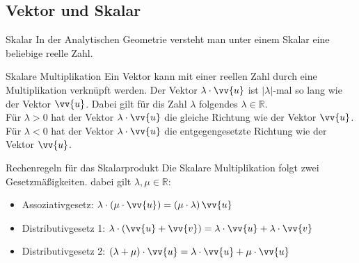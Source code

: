 \subsection{Vektor und Skalar}
\begin{merke}{Skalar}{}
   In der Analytischen Geometrie versteht man unter einem Skalar eine beliebige reelle Zahl. 
\end{merke}
\begin{defi}{Skalare Multiplikation}{}
Ein Vektor kann mit einer reellen Zahl durch eine Multiplikation verknüpft werden. Der Vektor $\lambda \cdot \vv{u}$ ist $|\lambda|$-mal so lang wie der Vektor $\vv{u}$. Dabei gilt für dis Zahl $\lambda$ folgendes $\lambda \in \mathds{R}$.\\
Für $\lambda > 0$ hat der Vektor $\lambda \cdot \vv{u}$ die gleiche Richtung wie der Vektor $\vv{u}$.\\
Für $\lambda < 0$ hat der Vektor $\lambda \cdot \vv{u}$ die entgegengesetzte Richtung wie der Vektor  $\vv{u}$.\\
\begin{center}
\end{center}
\end{defi}
\begin{satz}{Rechenregeln für das Skalarprodukt}{}
Die Skalare Multiplikation folgt zwei Gesetzmäßigkeiten. dabei gilt $\lambda, \mu \in \mathds{R}$:
\begin{itemize}
    \item Assoziativgesetz: $\lambda \cdot \left(\mu \cdot \vv{u}\right) =\left( \mu \cdot \lambda \right)\vv{u}$
    \item Distributivgesetz 1: $\lambda \cdot \left(\vv{u} + \vv{v}\right) =\lambda \cdot \vv{u} + \lambda \cdot \vv{v} $
    \item Distributivgesetz 2: $\left( \lambda + \mu\right) \cdot \vv{u} =\lambda \cdot \vv{u} + \mu \cdot \vv{u}  $
\end{itemize}
\end{satz}
